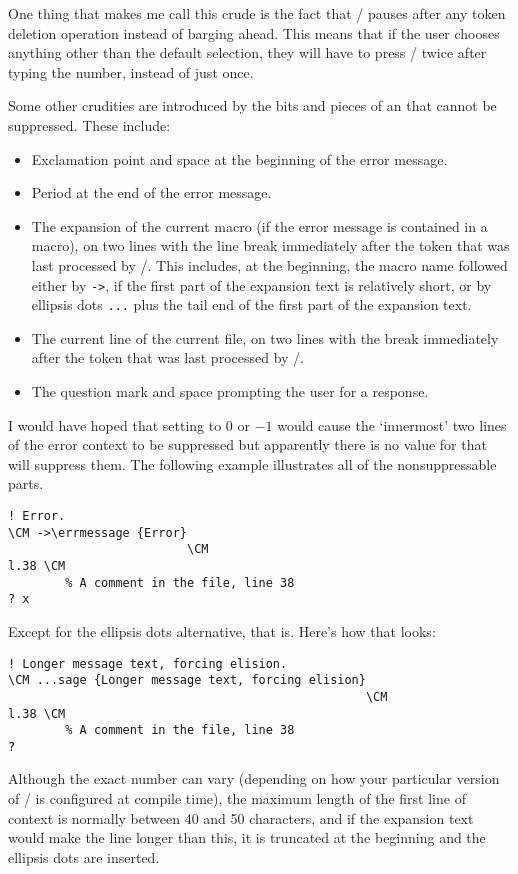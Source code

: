 {One thing that makes me call this crude is the fact that \tex/ pauses
after any token deletion operation instead of barging ahead. This means
that if the user chooses anything other than the default selection,
they will have to press \return/ twice after typing the number, instead
of just once.

Some other crudities are introduced by the bits and pieces of an
 that cannot be suppressed. These include:
\begin{itemize}
\item Exclamation point and space at the beginning of the error message.
\item Period at the end of the error message.

\item The expansion of the current macro (if the error message is
  contained in a macro), on two lines with the line break immediately
  after the token that was last processed by \tex/. This includes, at
  the beginning, the macro name followed either by \verb"->", if the
  first part of the expansion text is relatively short, or by ellipsis
  dots \verb"..." plus the tail end of the first part of the expansion
  text.

\item The current line of the current file, on two lines with the break
  immediately after the token that was last processed by \tex/.
\item The question mark and space prompting the user for a response.
\end{itemize}

I would have hoped that setting  to $0$ or $-1$
would  cause the `innermost' two lines of the error context to be
suppressed but apparently there is no value for 
that will suppress them. The following example illustrates all of the
nonsuppressable parts.
\begin{verbatim}
! Error.
\CM ->\errmessage {Error}
                         \CM
l.38 \CM
        % A comment in the file, line 38
? x
\end{verbatim}
Except for the ellipsis dots alternative, that is. Here's how that
looks:
\begin{verbatim}
! Longer message text, forcing elision.
\CM ...sage {Longer message text, forcing elision}
                                                  \CM
l.38 \CM
        % A comment in the file, line 38
?
\end{verbatim}
Although the exact number can vary (depending on how your particular
version of \tex/ is configured at compile time), the maximum
length of the first line of context is normally between 40 and 50
characters, and if the expansion text would make the line longer
than this, it is truncated at the beginning and the ellipsis
dots are inserted.

}
